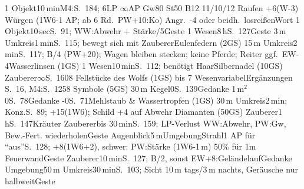 \documentclass{m5figur-mv}[2018/10/19]
\begin{document}
{{%
%
  {1 Objekt}{10\,min}{M4:S.~184; 6LP $\infty$AP Gw80 St50 B12 11/10/12
  Raufen +6(W-3) Würgen (1W6-1 AP; ab 6 Rd.\ PW+10:Ko)
  Angr.\ -4 oder beidh.\ losreißen}{Wort}
%
  {1 Objekt}{10\,sec}{S.~91; WW:Abwehr + Stärke/5}{Geste}
%
  {1 Wesen}{8\,h}{S.~127}{Geste}
%
  {3\,m Umkreis}{1\,min}{S.~115; bewegt sich mit Zauberer}{Eulenfedern (2GS)}
%
  {15\,m Umkreis}{2\,min}{S.~117; B/4 (PW+20); Wagen bleiben stecken;
  keine Pferde; Reiter ggf.\ EW-4}{Wasserlinsen (1GS)}
%
  {1 Wesen}{10\,min}{S.~112; benötigt Haar}{Silbernadel (10GS)}
%
  {Zauberer}{$\infty$}{S.~160}{8 Fellstücke des Wolfs (1GS)}
%
  {bis 7 Wesen}{variabel}{Ergänzungen S.~16, M4:S.~125}{8 Symbole (5GS)}
%
  {30\,m Kegel}{0}{S.~139}{Gedanke}
%
  {1\,m$^2$}{0}{S.~78}{Gedanke}
%
  {-}{0}{S.~71}{Mehlstaub \& Wassertropfen (1GS)}
%
  {30\,m Umkreis}{2\,min; Konz.}{S.~89; +15(1W6); Schild +4 auf Abwehr}%
  {Diamanten (50GS)}
%
  {Zauberer}{1\,h}{S.~147}{Kräuter}
%
  {Zauberer}{bis 30\,min}{S.~159; LP-Verlust WW:Abwehr, PW:Gw, Bew.-Fert.
  wiederholen}{Geste}
%
  {Augenblick}{5\,m}{Umgebung}{Strahl}{1 AP für "`aus"'}{S.~128;
  +8(1W6+2), schwer: PW:Stärke (1W6-1\,m) 50\% für 1m Feuerwand}{Geste}
%
  {Zauberer}{10\,min}{S.~127; B/2, sonst EW+8:Geländelauf}{Gedanke}
%
  {Umgebung}{50\,m Umkreis}{30\,min}{S.~103; Sicht 10\,m tags/3\,m nachts,
  Geräusche nur halbweit}{Geste}



}}
\end{document}
